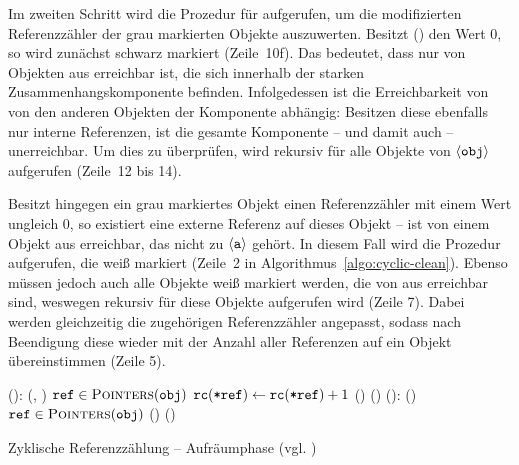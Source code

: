 Im zweiten Schritt wird die Prozedur  für  aufgerufen, um die modifizierten Referenzzähler der grau markierten Objekte auszuwerten.
Besitzt () den Wert $0$, so wird  zunächst schwarz markiert (Zeile~10f).
Das bedeutet, dass  nur von Objekten aus erreichbar ist, die sich innerhalb der starken Zusammenhangskomponente befinden.
Infolgedessen ist die Erreichbarkeit von  von den anderen Objekten der Komponente abhängig: Besitzen diese ebenfalls nur interne Referenzen, ist die gesamte Komponente -- und damit auch  -- unerreichbar.
Um dies zu überprüfen, wird  rekursiv für alle Objekte von $\left\langle\texttt{obj}\right\rangle$ aufgerufen (Zeile~12 bis 14).

Besitzt hingegen ein grau markiertes Objekt  einen Referenzzähler mit einem Wert ungleich $0$, so existiert eine externe Referenz auf dieses Objekt --  ist von einem Objekt aus erreichbar, das nicht zu $\left\langle\texttt{a}\right\rangle$ gehört.
In diesem Fall wird die Prozedur  aufgerufen, die  weiß markiert (Zeile~2 in Algorithmus~\ref{algo:cyclic-clean}).
Ebenso müssen jedoch auch alle Objekte weiß markiert werden, die von  aus erreichbar sind, 
weswegen  rekursiv für diese Objekte aufgerufen wird (Zeile 7).
Dabei werden gleichzeitig die zugehörigen Referenzzähler angepasst, sodass nach Beendigung diese wieder mit der Anzahl aller Referenzen auf ein Objekt übereinstimmen (Zeile 5).

\begin{algorithm}[h]
\begin{algorithmic}[1]
	\State {}():
	\State \quad {}(, )		
	\State \quad \FOREACH $\texttt{ref} \in \textsc{Pointers}(\texttt{obj})$
	\State \quad \quad $\texttt{rc}(\texttt{*ref}) \gets \texttt{rc}(\texttt{*ref})+1$ 
	\State \quad \quad \IF \NOT {}()
	\State \quad \quad \quad {}()
	\Statex
	\State {}():
	\State \quad \IF {}()	
	\State \quad \quad \FOREACH $\texttt{ref} \in \textsc{Pointers}(\texttt{obj})$
	\State \quad \quad \quad {}()
	\State \quad \quad {}()
\end{algorithmic}
\caption[Zyklische Referenzzählung -- Aufräumphase]{Zyklische Referenzzählung -- Aufräumphase (vgl. \cite[S. 33]{martinez1990})}
\label{algo:cyclic-clean}
\end{algorithm}

